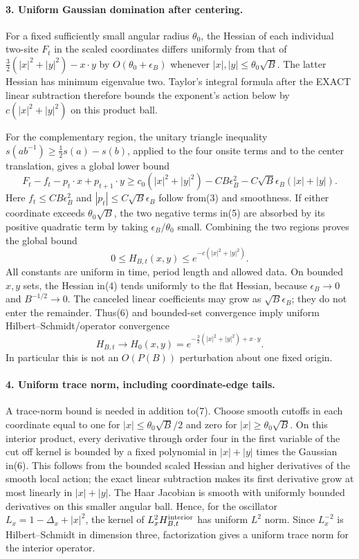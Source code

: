 \documentclass[11pt]{article}
\begin{document}
\paragraph{3. Uniform Gaussian domination after centering.}
For a fixed sufficiently small angular radius $\theta_0$, the Hessian of each
individual two-site $F_t$ in the scaled coordinates differs uniformly from
that of
$\frac32(|x|^2+|y|^2)-x\cdot y$ by $O(\theta_0+\epsilon_B)$ whenever
$|x|,|y|\le\theta_0\sqrt B$. The latter Hessian has minimum eigenvalue two.
Taylor's integral formula after the EXACT linear subtraction therefore bounds
the exponent's action below by $c(|x|^2+|y|^2)$ on this product ball.

For the complementary region, the unitary triangle inequality
$s(ab^{-1})\ge\frac12s(a)-s(b)$, applied to the four onsite terms and to the
center translation, gives a global lower bound
\[
 F_t-f_t-p_t\cdot x+p_{t+1}\cdot y
 \ge c_0(|x|^2+|y|^2)-C B\epsilon_B^2
                  -C\sqrt B\epsilon_B(|x|+|y|).                          \tag{5}
\]
Here $f_t\le CB\epsilon_B^2$ and $|p_t|\le C\sqrt B\epsilon_B$ follow from(3)
and smoothness. If either coordinate exceeds $\theta_0\sqrt B$, the two
negative terms in(5) are absorbed by its positive quadratic term by taking
$\epsilon_B/\theta_0$ small. Combining the two regions proves the global bound
\[
 0\le H_{B,t}(x,y)\le e^{-c(|x|^2+|y|^2)}.                             \tag{6}
\]
All constants are uniform in time, period length and allowed data.
On bounded $x,y$ sets, the Hessian in(4) tends uniformly to the flat Hessian,
because $\epsilon_B\to0$ and $B^{-1/2}\to0$. The canceled linear coefficients
may grow as $\sqrt B\epsilon_B$; they do not enter the remainder. Thus(6) and
bounded-set convergence imply uniform Hilbert--Schmidt/operator convergence
\[
 H_{B,t}\longrightarrow H_0(x,y)=e^{-\frac32(|x|^2+|y|^2)+x\cdot y}.       \tag{7}
\]
In particular this is not an $O(P(B))$ perturbation about one fixed origin.

\paragraph{4. Uniform trace norm, including coordinate-edge tails.}
A trace-norm bound is needed in addition to(7). Choose smooth cutoffs in each
coordinate equal to one for $|x|\le\theta_0\sqrt B/2$ and zero for
$|x|\ge\theta_0\sqrt B$. On this interior product, every derivative through
order four in the first variable of the cut off kernel is bounded by a fixed
polynomial in $|x|+|y|$ times the Gaussian in(6). This follows from the bounded
scaled Hessian and higher derivatives of the smooth local action; the exact
linear subtraction makes its first derivative grow at most linearly in
$|x|+|y|$. The Haar Jacobian is smooth with uniformly bounded derivatives on
this smaller angular ball. Hence, for the oscillator
$L_x=1-\Delta_x+|x|^2$, the kernel of $L_x^2H_{B,t}^{\rm interior}$ has
uniform $L^2$ norm. Since $L_x^{-2}$ is Hilbert--Schmidt in dimension three,
factorization gives a uniform trace norm for the interior operator.
\end{document}
